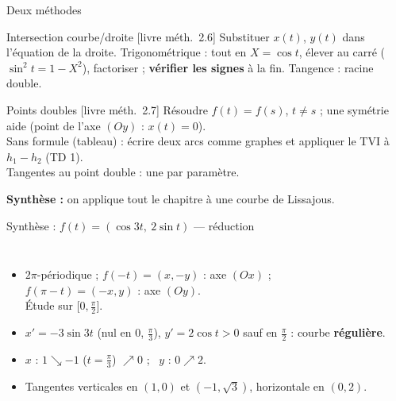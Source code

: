 \documentclass[aspectratio=169,11pt]{beamer}
\newcommand{\livre}[1]{{\sffamily\scriptsize\color{Gris}[livre #1]}}
\begin{document}
\begin{frame}{Deux méthodes}
\begin{METH}{Intersection courbe/droite \livre{méth.~2.6}}
Substituer $x(t)$, $y(t)$ dans l'équation de la droite. Trigonométrique : tout en $X=\cos t$, élever au carré
($\sin^2t=1-X^2$), factoriser ; \textbf{vérifier les signes} à la fin. Tangence : racine double.
\end{METH}
\pause
\begin{METH}{Points doubles \livre{méth.~2.7}}
Résoudre $f(t)=f(s)$, $t\neq s$ ; une symétrie aide (point de l'axe $(Oy)$ : $x(t)=0$).\\
Sans formule (tableau) : écrire deux arcs comme graphes et appliquer le TVI à $h_1-h_2$ (TD 1).\\
Tangentes au point double : une par paramètre.
\end{METH}
\pause
\textbf{Synthèse :} on applique tout le chapitre à une courbe de Lissajous.
\end{frame}

\begin{frame}{Synthèse : $f(t)=(\cos3t,\ 2\sin t)$ --- réduction}
\begin{columns}[c]
\begin{itemize}
\item $2\pi$-périodique ; $f(-t)=(x,-y)$ : axe $(Ox)$ ;\\ $f(\pi-t)=(-x,y)$ : axe $(Oy)$.\\
      Étude sur $\big[0,\frac\pi2\big]$.
\pause
\item $x'=-3\sin3t$ (nul en $0$, $\frac\pi3$), $y'=2\cos t>0$ sauf en $\frac\pi2$ : courbe \textbf{régulière}.
\pause
\item $x$ : $1\searrow-1$ ($t=\frac\pi3$) $\nearrow0$ ; \ $y$ : $0\nearrow2$.
\item Tangentes verticales en $(1,0)$ et $(-1,\sqrt3)$, horizontale en $(0,2)$.
\end{itemize}
\centering{}
\end{columns}
\end{frame}
\end{document}
